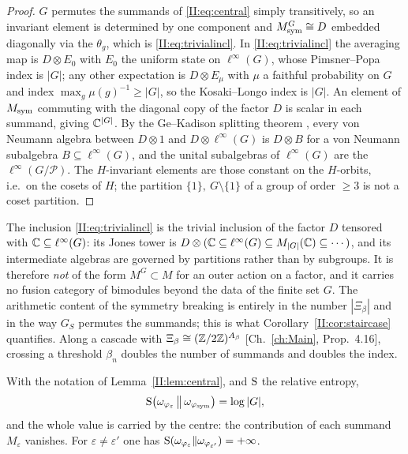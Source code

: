 \begin{proof}
$G$ permutes the summands of \eqref{II:eq:central} simply transitively, so an invariant element
is determined by one component and $M_{\mathrm{sym}}^G\cong D$ embedded diagonally via the $\theta_g$,
which is \eqref{II:eq:trivialincl}. In \eqref{II:eq:trivialincl} the averaging map is
$D\otimes E_0$ with $E_0$ the uniform state on $\ell^\infty(G)$, whose Pimsner--Popa index
is $|G|$; any other expectation is $D\otimes E_\mu$ with $\mu$ a faithful probability on
$G$ and index $\max_g\mu(g)^{-1}\ge|G|$, so the Kosaki--Longo index is $|G|$. An element of
$M_{\mathrm{sym}}$ commuting with the diagonal copy of the factor $D$ is scalar in each summand, giving
$\mathbb{C}^{|G|}$. By the Ge--Kadison splitting theorem \cite{GK}, every von Neumann algebra
between $D\otimes1$ and $D\otimes\ell^\infty(G)$ is $D\otimes B$ for a von Neumann
subalgebra $B\subseteq\ell^\infty(G)$, and the unital subalgebras of $\ell^\infty(G)$ are the
$\ell^\infty(G/\mathcal P)$. The $H$-invariant elements are those constant on the
$H$-orbits, i.e.\ on the cosets of $H$; the partition $\{1\},\ G\setminus\{1\}$ of a group of
order $\ge3$ is not a coset partition.
\end{proof}

\begin{remark}\label{II:rem:nostandard}
The inclusion \eqref{II:eq:trivialincl} is the trivial inclusion of the factor $D$ tensored
with $\mathbb{C}\subseteq\ell^\infty(G)$: its Jones tower is $D\otimes(\mathbb{C}\subseteq\ell^\infty(G)\subseteq
M_{|G|}(\mathbb{C})\subseteq\cdots)$, and its intermediate algebras are governed by partitions rather
than by subgroups. It is therefore \emph{not} of the form $M^G\subset M$ for an outer action
on a factor, and it carries no fusion category of bimodules beyond the data of the finite set
$G$. The arithmetic content of the symmetry breaking is entirely in the number $|\Xi_\beta|$
and in the way $G_S$ permutes the summands; this is what Corollary~\ref{II:cor:staircase}
quantifies. Along a cascade with $\Xi_\beta\cong(\mathbb{Z}/2\mathbb{Z})^{A_\beta}$ [Ch.~\ref{ch:Main}, Prop.~4.16],
crossing a threshold $\beta_n$ doubles the number of summands and doubles the index.
\end{remark}

\begin{lemma}\label{II:lem:relent}
With the notation of Lemma~\ref{II:lem:central}, and $\mathrm{S}$ the relative entropy,
\[
\mathrm{S}\bigl(\omega_{\varphi_\varepsilon}\,\big\|\,\omega_{\varphi_{\mathrm{sym}}}\bigr)=\log|G| ,
\]
and the whole value is carried by the centre: the contribution of each summand
$M_\varepsilon$ vanishes. For $\varepsilon\ne\varepsilon'$ one has
$\mathrm{S}(\omega_{\varphi_\varepsilon}\|\omega_{\varphi_{\varepsilon'}})=+\infty$.
\end{lemma}

